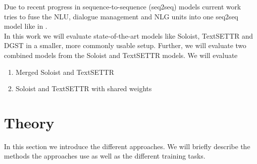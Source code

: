 \documentclass[twocolumn]{tum-article}
\begin{document}
Due to recent progress in sequence-to-sequence (seq2seq) models \cite{radford2019language, raffel2019exploring} current work tries to fuse the NLU, dialogue management and NLG units into one seq2seq model like in \cite{peng2020soloist}. \\
In this work we will evaluate state-of-the-art models like Soloist, TextSETTR and DGST in a smaller, more commonly usable setup. Further, we will evaluate two combined models from the Soloist and TextSETTR models. We will evaluate 
\begin{enumerate}
\item Merged Soloist and TextSETTR
\item Soloist and TextSETTR with shared weights
\end{enumerate}
\section{Theory}
In this section we introduce the different approaches. We will briefly describe the methods the approaches use as well as the different training tasks. 
\end{document}
